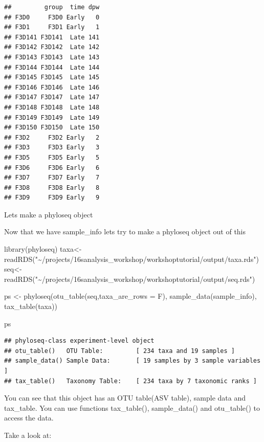 \documentclass[
]{book}
\newenvironment{Shaded}{\begin{snugshade}}{\end{snugshade}}
\newcommand{\AttributeTok}[1]{\textcolor[rgb]{0.77,0.63,0.00}{#1}}
\newcommand{\FunctionTok}[1]{\textcolor[rgb]{0.00,0.00,0.00}{#1}}
\newcommand{\NormalTok}[1]{#1}
\newcommand{\OtherTok}[1]{\textcolor[rgb]{0.56,0.35,0.01}{#1}}
\newcommand{\StringTok}[1]{\textcolor[rgb]{0.31,0.60,0.02}{#1}}
\begin{document}
\begin{verbatim}
##         group  time dpw
## F3D0     F3D0 Early   0
## F3D1     F3D1 Early   1
## F3D141 F3D141  Late 141
## F3D142 F3D142  Late 142
## F3D143 F3D143  Late 143
## F3D144 F3D144  Late 144
## F3D145 F3D145  Late 145
## F3D146 F3D146  Late 146
## F3D147 F3D147  Late 147
## F3D148 F3D148  Late 148
## F3D149 F3D149  Late 149
## F3D150 F3D150  Late 150
## F3D2     F3D2 Early   2
## F3D3     F3D3 Early   3
## F3D5     F3D5 Early   5
## F3D6     F3D6 Early   6
## F3D7     F3D7 Early   7
## F3D8     F3D8 Early   8
## F3D9     F3D9 Early   9
\end{verbatim}

Lets make a phyloseq object

Now that we have sample\_info lets try to make a phyloseq object out of this

\begin{Shaded}
\begin{Highlighting}[]
\FunctionTok{library}\NormalTok{(phyloseq)}
\NormalTok{taxa}\OtherTok{\textless{}{-}}\FunctionTok{readRDS}\NormalTok{(}\StringTok{"\textasciitilde{}/projects/16sanalysis\_workshop/workshoptutorial/output/taxa.rds"}\NormalTok{)}
\NormalTok{seq}\OtherTok{\textless{}{-}}\FunctionTok{readRDS}\NormalTok{(}\StringTok{"\textasciitilde{}/projects/16sanalysis\_workshop/workshoptutorial/output/seq.rds"}\NormalTok{)}

\NormalTok{ps }\OtherTok{\textless{}{-}} \FunctionTok{phyloseq}\NormalTok{(}\FunctionTok{otu\_table}\NormalTok{(seq,}\AttributeTok{taxa\_are\_rows =}\NormalTok{ F),}
               \FunctionTok{sample\_data}\NormalTok{(sample\_info),}
               \FunctionTok{tax\_table}\NormalTok{(taxa))}

\NormalTok{ps}
\end{Highlighting}
\end{Shaded}

\begin{verbatim}
## phyloseq-class experiment-level object
## otu_table()   OTU Table:         [ 234 taxa and 19 samples ]
## sample_data() Sample Data:       [ 19 samples by 3 sample variables ]
## tax_table()   Taxonomy Table:    [ 234 taxa by 7 taxonomic ranks ]
\end{verbatim}

You can see that this object has an OTU table(ASV table), sample data and tax\_table. You can use functions tax\_table(), sample\_data() and otu\_table() to access the data.

Take a look at:
\end{document}

